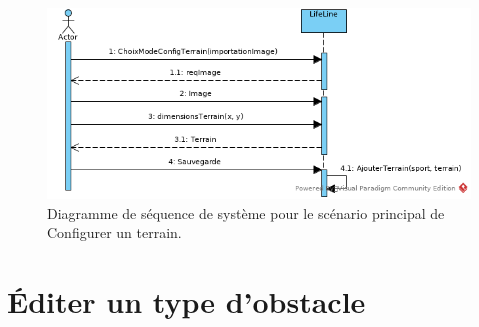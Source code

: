 \begin{figure}[htpb]
    \centering
    \includegraphics[scale=0.6]{fig/ssd_configuration_terrain.png}
    \caption{Diagramme de séquence de système pour le scénario principal de Configurer un terrain.}
    \label{fig:ssd_sp_configuration_terrain}
\end{figure}



\section{Éditer un type d'obstacle}
\label{sec:editer_un_type_d_obstacle}

